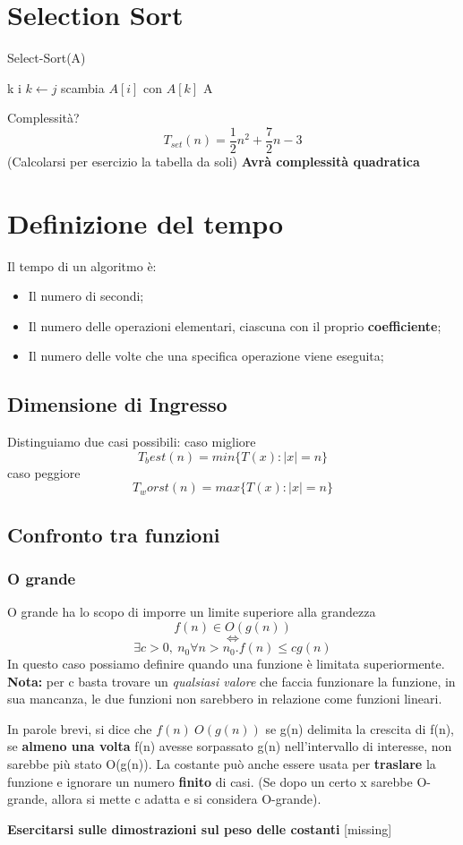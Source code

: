 \documentclass[twocolumn]{article}
\newcommand{\definition}[1]{\begin{mycolorbox}[colback=colorone]
\fontfamily{qcr}\selectfont #1 \fontfamily{cmr}\selectfont
\end{mycolorbox}}
\begin{document}
\section{Selection Sort}
\begin{algorithm}
    \caption{Select-Sort(A)}
    \begin{algorithmic}
        \STATE k \leftarrow i
        \STATE $k \leftarrow j$
        \ENDIF
        \ENDFOR
        \STATE scambia $A[i]$ con $A[k]$
        \ENDFOR
        \RETURN A
    \end{algorithmic}
\end{algorithm}
Complessità?
\[T_{set}(n) = \frac{1}{2}n^2 + \frac{7}{2}n - 3\]
(Calcolarsi per esercizio la tabella da soli)
\newline \textbf{Avrà complessità quadratica}
\section{Definizione del tempo}
\definition{Il tempo di un algoritmo è: \begin{itemize}
    \item Il numero di secondi;
    \item Il numero delle operazioni elementari, ciascuna con il proprio \textbf{coefficiente};
    \item Il numero delle volte che una specifica operazione viene eseguita;
\end{itemize}}
\subsection{Dimensione di Ingresso}
Distinguiamo due casi possibili:
caso migliore \[T_best(n)=min\{ T(x): |x| = n \}\]
caso peggiore
\[T_worst(n)=max\{ T(x): |x| = n\}\]
\subsection{Confronto tra funzioni}
\subsubsection{O grande}
O grande ha lo scopo di imporre un limite superiore alla grandezza
\[f(n) \in O(g(n)) \]\[\iff\]\[ \exists c > 0, \: n_0 \forall n > n_0. f(n) \leq cg(n)\]
In questo caso possiamo definire quando una funzione è limitata superiormente.
\textbf{Nota:} per c basta trovare un \textit{qualsiasi valore} che faccia funzionare la funzione, in sua mancanza, le due funzioni non sarebbero in relazione come funzioni lineari.

In parole brevi, si dice che $f(n) \: O(g(n))$ se g(n) delimita la crescita di f(n), se \textbf{almeno una volta} f(n) avesse sorpassato g(n) nell'intervallo di interesse, non sarebbe più stato O(g(n)). La costante può anche essere usata per \textbf{traslare} la funzione e ignorare un numero \textbf{finito} di casi. (Se dopo un certo x sarebbe O-grande, allora si mette c adatta e si considera O-grande). 

\newline
\textbf{Esercitarsi sulle dimostrazioni sul peso delle costanti}
[missing]
\end{document}
